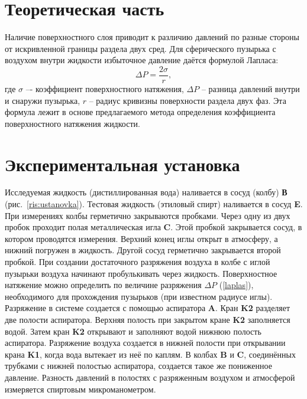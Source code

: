 \documentclass[a4paper,12pt]{article} %
\begin{document}
\section{Теоретическая часть}
	Наличие поверхностного слоя приводит к различию давлений по разные стороны от искривленной границы раздела двух сред. Для сферического пузырька с воздухом  внутри жидкости избыточное давление даётся формулой Лапласа:
	\begin{equation}
		\label{laplas}
		\Delta P = \frac{2\sigma}{r},
	\end{equation}
	где $\sigma$ –- коэффициент поверхностного натяжения, $\Delta P$ – разница давлений внутри и снаружи пузырька, $r$ – радиус кривизны поверхности раздела двух фаз. Эта формула лежит в основе предлагаемого метода определения коэффициента поверхностного натяжения жидкости.
\section{Экспериментальная установка}
	Исследуемая жидкость (дистиллированная вода) наливается в сосуд (колбу) \textbf{В} (рис.~\ref{ris:ustanovka}). Тестовая жидкость  (этиловый спирт) наливается  в сосуд \textbf{E}. При измерениях  колбы герметично закрываются  пробками.   Через одну из двух пробок  проходит полая металлическая игла \textbf{C}. Этой пробкой закрывается сосуд, в котором  проводятся измерения. Верхний конец иглы открыт в атмосферу, а нижний погружен в жидкость. Другой сосуд герметично закрывается второй пробкой. При создании достаточного  разряжения воздуха в колбе с иглой пузырьки воздуха начинают пробулькивать через жидкость. Поверхностное натяжение можно определить по величине разряжения $\Delta P$ (\ref{laplas}), необходимого для прохождения пузырьков (при известном радиусе иглы).\\
	Разряжение в системе создается с помощью аспиратора \textbf{A}. Кран \textbf{K2} разделяет две полости аспиратора. Верхняя полость при закрытом кране \textbf{K2}  заполняется водой. Затем кран \textbf{K2} открывают и заполняют водой  нижнюю полость  аспиратора.  Разряжение воздуха создается в нижней полости  при открывании крана \textbf{K1}, когда  вода вытекает из неё по каплям. В колбах \textbf{B} и \textbf{C}, соединённых трубками с нижней полостью аспиратора,  создается такое же пониженное давление. Разность давлений в полостях с разряженным воздухом и атмосферой измеряется спиртовым микроманометром.
\end{document}
